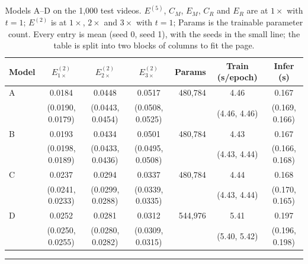 \documentclass[11pt,letterpaper]{article}
\begin{document}
\begin{table}[htbp]
\begin{tabular}{@{}l ccc rcc@{}}
  \toprule
  Model & $E^{(2)}_{1\times}$ & $E^{(2)}_{2\times}$ & $E^{(2)}_{3\times}$ & Params & Train (s/epoch) & Infer (s) \\
  \midrule
A & 0.0184 & 0.0448 & 0.0517 & 480{,}784 & 4.46 & 0.167 \\
 & \scriptsize(0.0190, 0.0179) & \scriptsize(0.0443, 0.0454) & \scriptsize(0.0508, 0.0525) &  & \scriptsize(4.46, 4.46) & \scriptsize(0.169, 0.166) \\
\addlinespace[2pt]
B & 0.0193 & 0.0434 & 0.0501 & 480{,}784 & 4.43 & 0.167 \\
 & \scriptsize(0.0198, 0.0189) & \scriptsize(0.0433, 0.0436) & \scriptsize(0.0495, 0.0508) &  & \scriptsize(4.43, 4.44) & \scriptsize(0.166, 0.168) \\
\addlinespace[2pt]
C & 0.0237 & 0.0294 & 0.0337 & 480{,}784 & 4.44 & 0.168 \\
 & \scriptsize(0.0241, 0.0233) & \scriptsize(0.0299, 0.0288) & \scriptsize(0.0339, 0.0335) &  & \scriptsize(4.43, 4.44) & \scriptsize(0.170, 0.165) \\
\addlinespace[2pt]
D & 0.0252 & 0.0281 & 0.0312 & 544{,}976 & 5.41 & 0.197 \\
 & \scriptsize(0.0250, 0.0255) & \scriptsize(0.0280, 0.0282) & \scriptsize(0.0309, 0.0315) &  & \scriptsize(5.40, 5.42) & \scriptsize(0.196, 0.198) \\
  \bottomrule
\end{tabular}
  \caption{Models A--D on the 1,000 test videos. $E^{(5)}$, $C_M$, $E_M$, $C_R$ and $E_R$ are at $1\times$ with
  $t=1$; $E^{(2)}$ is at $1\times$, $2\times$ and $3\times$ with $t=1$; Params is the trainable parameter count.
  Every entry is mean (seed 0, seed 1), with the seeds in the small line; the table is split into two blocks of
  columns to fit the page.} 
  \label{tab:models}
\end{table}

\vspace{10pt}
\hrule
\vspace{4pt}
\end{document}
